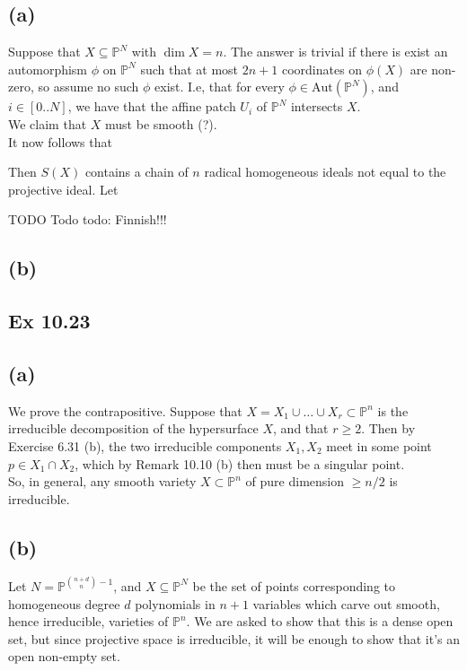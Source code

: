 \documentclass{article}
\theoremstyle{definition}
\renewcommand{\P}{\mathbb{P}}
\newcommand{\PP}[1]{\P^{#1}}
\newcommand{\Pn}{\P^n}
\newcommand{\Aut}{\text{Aut}}
\begin{document}
\subsection*{(a)}

Suppose that $X \subseteq \PP{N}$ with $\dim X = n$. The answer is trivial if
there is exist an automorphism $\phi$ on $\PP{N}$ such that at most $2n + 1$
coordinates on $\phi(X)$ are non-zero, so assume no such $\phi$ exist. I.e,
that for every $\phi \in \Aut(\PP{N})$, and $i \in [0..N]$, we have that the
affine patch $U_i$ of $\PP{N}$ intersects $X$. \\

We claim that $X$ must be smooth (?). \\

It now follows that


Then $S(X)$ contains a
chain of $n$ radical homogeneous ideals not equal to the projective ideal.
Let 


TODO Todo todo: Finnish!!!

\subsection*{(b)}

\subsection*{Ex 10.23}

\subsection*{(a)}

We prove the contrapositive. Suppose that $X = X_1 \cup \ldots \cup X_r \subset
\Pn$ is the irreducible decomposition of the hypersurface $X$, and that $r \geq
2$. Then by Exercise 6.31 (b), the two irreducible components $X_1, X_2$ meet
in some point $p \in X_1 \cap X_2$, which by Remark 10.10 (b) then must be a
singular point. \\

So, in general, any smooth variety $X \subset \Pn$ of pure dimension $\geq n/2$
is irreducible.

\subsection*{(b)}

Let $N = \PP{\binom{n + d}{n} - 1}$,
and $X \subseteq \PP{N}$ be the set of points corresponding
to homogeneous degree $d$ polynomials in $n + 1$ variables which carve out
smooth, hence irreducible, varieties of $\PP{n}$. We are asked to show that this
is a dense open set, but since projective space is irreducible, it will be
enough to show that it's an open non-empty set. \\
\end{document}

